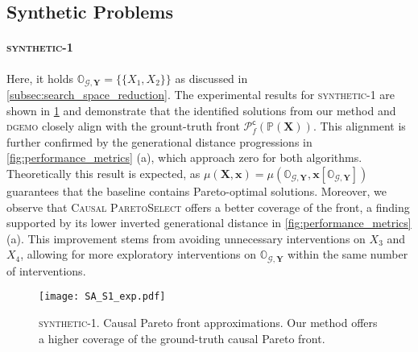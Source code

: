 \subsection{Synthetic Problems}

\paragraph{\textsc{synthetic-1}} Here, it holds $\mathbb{O}_{\mathcal{G},\mathbf{Y}}= \{ \{X_1,X_2\} \}$ as discussed in \cref{subsec:search_space_reduction}.
The experimental results for \textsc{synthetic-1} are shown in \cref{fig:synthetic1_fronts} and demonstrate that the identified solutions from our method and \textsc{dgemo} closely align with the grount-truth front $\mathcal{P}_f^{\textsf{c}}(\mathbb{P}(\mathbf{X}))$. 
This alignment is further confirmed by the generational distance progressions in \cref{fig:performance_metrics} (a), which approach zero for both algorithms. Theoretically this result is expected, as $\mu(\mathbf{X},\mathbf{x}) = \mu(\mathbb{O}_{\mathcal{G},\mathbf{Y}},\mathbf{x}[\mathbb{O}_{\mathcal{G},\mathbf{Y}}])$ guarantees that the baseline contains Pareto-optimal solutions. Moreover, we observe that \textsc{Causal ParetoSelect} offers a better coverage of the front, a finding supported by its lower inverted generational distance in \cref{fig:performance_metrics} (a). This improvement stems from avoiding unnecessary interventions on $X_3$ and $X_4$, allowing for more exploratory interventions on $\mathbb{O}_{\mathcal{G},\mathbf{Y}}$ within the same number of interventions. 

\begin{figure}[h]
\centering
\vspace{-1.8cm}
\texttt{[image: SA\_S1\_exp.pdf]}
\vspace{-2.3cm}
\caption{\textsc{synthetic-1}. Causal Pareto front approximations. Our method offers a higher coverage of the ground-truth causal Pareto front.}
\label{fig:synthetic1_fronts}
\end{figure}

